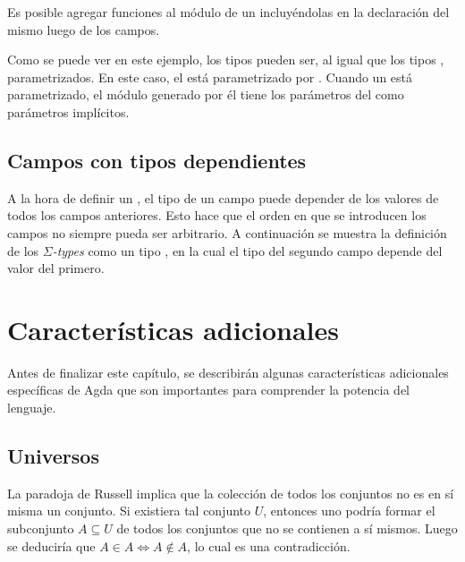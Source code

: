 
Es posible agregar funciones al módulo de un  incluyéndolas en la declaración del mismo luego de los campos. 


Como se puede ver en este ejemplo, los tipos  pueden ser, al igual que los tipos , parametrizados. En este caso, el   está parametrizado por . Cuando un  está parametrizado, el módulo generado por él tiene los parámetros del  como parámetros implícitos.

\subsection{Campos con tipos dependientes}\label{records:dep}

A la hora de definir un , el tipo de un campo puede depender de los valores de todos los campos anteriores. Esto hace que el orden en que se introducen los campos no siempre pueda ser arbitrario. A continuación se muestra la definición de los $\Sigma$\textit{-types} como un tipo , en la cual el tipo del segundo campo depende del valor del primero.


\section{Características adicionales}\label{agda:additional}

Antes de finalizar este capítulo, se describirán algunas características adicionales específicas de Agda que son importantes para comprender la potencia del lenguaje.

\subsection{Universos}\label{additional:univ}

La paradoja de Russell implica que la colección de todos los conjuntos no es en sí misma un conjunto. Si existiera tal conjunto $U$, entonces uno podría formar el subconjunto $A \subseteq U$ de todos los conjuntos que no se contienen a sí mismos. Luego se deduciría que $A \in A \iff A \notin A$, lo cual es una contradicción.

